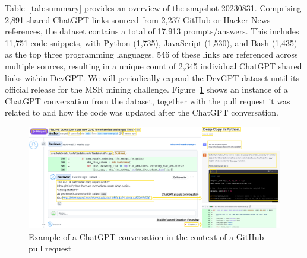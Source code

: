 \documentclass[10pt,conference]{IEEEtran}
\begin{document}

Table~\ref{tab:summary} provides an overview of the snapshot 20230831. Comprising 2,891 shared ChatGPT links sourced from 2,237 GitHub or Hacker News references, the dataset contains a total of 17,913 prompts/answers. This includes 11,751 code snippets, with Python (1,735), JavaScript (1,530), and Bash (1,435) as the top three programming languages. 546 of these links are referenced across multiple sources, resulting in a unique count of 2,345 individual ChatGPT shared links within DevGPT. We will periodically expand the DevGPT dataset until its official release for the MSR mining challenge. Figure~\ref{fig:exm} shows an instance of a ChatGPT conversation from the dataset, together with the pull request it was related to and how the code was updated after the ChatGPT conversation.

\begin{figure}[h]
\caption{Example of a ChatGPT conversation in the context of a GitHub pull request}
\label{fig:exm}
\centering
\includegraphics[width=\textwidth]{example.png}
\end{figure}
\end{document}
